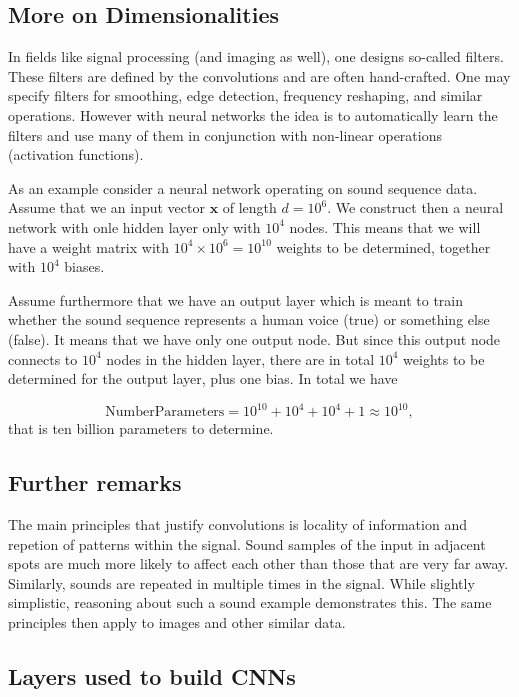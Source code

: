 \documentclass[%
oneside,                 %
final,                   %
10pt]{article}
\begin{document}
\subsection{More on Dimensionalities}

In fields like signal processing (and imaging as well), one designs
so-called filters. These filters are defined by the convolutions and
are often hand-crafted. One may specify filters for smoothing, edge
detection, frequency reshaping, and similar operations. However with
neural networks the idea is to automatically learn the filters and use
many of them in conjunction with non-linear operations (activation
functions).

As an example consider a neural network operating on sound sequence
data.  Assume that we an input vector $\bm{x}$ of length $d=10^6$.  We
construct then a neural network with onle hidden layer only with
$10^4$ nodes. This means that we will have a weight matrix with
$10^4\times 10^6=10^{10}$ weights to be determined, together with $10^4$ biases.

Assume furthermore that we have an output layer which is meant to train whether the sound sequence represents a human voice (true) or something else (false).
It means that we have only one output node. But since this output node connects to $10^4$ nodes in the hidden layer, there are in total $10^4$ weights to be determined for the output layer, plus one bias. In total we have

\[
\mathrm{NumberParameters}=10^{10}+10^4+10^4+1 \approx 10^{10},
\]
that is ten billion parameters to determine. 

\subsection{Further remarks}

The main principles that justify convolutions is locality of
information and repetion of patterns within the signal. Sound samples
of the input in adjacent spots are much more likely to affect each
other than those that are very far away. Similarly, sounds are
repeated in multiple times in the signal. While slightly simplistic,
reasoning about such a sound example demonstrates this. The same
principles then apply to images and other similar data.

\subsection{Layers used to build CNNs}
\end{document}
